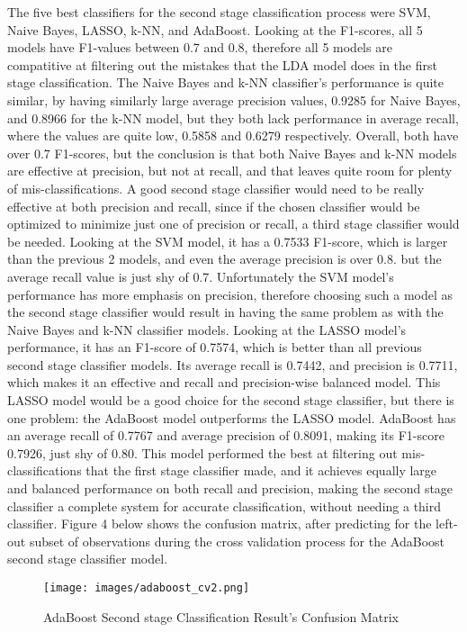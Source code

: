 \documentclass[11pt]{article}
\begin{document}
The five best classifiers for the second stage classification process were SVM, Naive Bayes, LASSO, k-NN, and AdaBoost. Looking at the F1-scores, all 5 models have F1-values between 0.7 and 0.8, therefore all 5 models are compatitive at filtering out the mistakes that the LDA model does in the first stage classification. The Naive Bayes and k-NN classifier's performance is quite similar, by having similarly large average precision values, 0.9285 for Naive Bayes, and 0.8966 for the k-NN model, but they both lack performance in average recall, where the values are quite low, 0.5858 and 0.6279 respectively. Overall, both have over 0.7 F1-scores, but the conclusion is that both Naive Bayes and k-NN models are effective at precision, but not at recall, and that leaves quite room for plenty of mis-classifications. A good second stage classifier would need to be really effective at both precision and recall, since if the chosen classifier would be optimized to minimize just one of precision or recall, a third stage classifier would be needed. Looking at the SVM model, it has a 0.7533 F1-score, which is larger than the previous 2 models, and even the average precision is over 0.8. but the average recall value is just shy of 0.7. Unfortunately the SVM model's performance has more emphasis on precision, therefore choosing such a model as the second stage classifier would result in having the same problem as with the Naive Bayes and k-NN classifier models. Looking at the LASSO model's performance, it has an F1-score of 0.7574, which is better than all previous second stage classifier models. Its average recall is 0.7442, and precision is 0.7711, which makes it an effective and recall and precision-wise balanced model. This LASSO model would be a good choice for the second stage classifier, but there is one problem: the AdaBoost model outperforms the LASSO model. AdaBoost has an average recall of 0.7767 and average precision of 0.8091, making its F1-score 0.7926, just shy of 0.80. This model performed the best at filtering out mis-classifications that the first stage classifier made, and it achieves equally large and balanced performance on both recall and precision, making the second stage classifier a complete system for accurate classification, without needing a third classifier. Figure 4 below shows the confusion matrix, after predicting for the left-out subset of observations during the cross validation process for the AdaBoost second stage classifier model.

\begin{figure}[h!]
    \centering
    \texttt{[image: images/adaboost\_cv2.png]}
    \caption{AdaBoost Second stage Classification Result's Confusion Matrix}
    \label{fig:adaBoostCV}
\end{figure}
\end{document}
